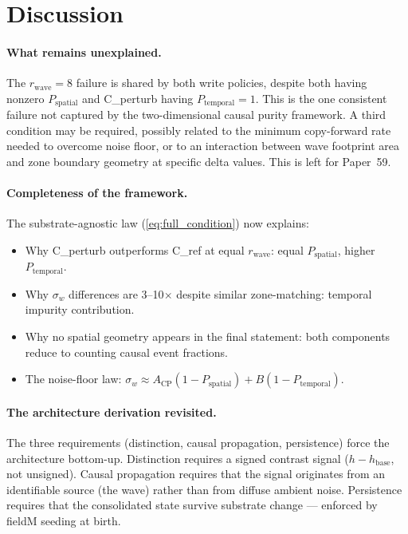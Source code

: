 \documentclass[11pt,a4paper]{article}
\newcommand{\Psp}{P_{\mathrm{spatial}}}
\newcommand{\Ptemp}{P_{\mathrm{temporal}}}
\begin{document}
\section{Discussion}

\paragraph{What remains unexplained.}
The $r_\mathrm{wave}=8$ failure is shared by both write policies, despite both having
nonzero $\Psp$ and C\_perturb having $\Ptemp=1$.
This is the one consistent failure not captured by the two-dimensional causal purity
framework.
A third condition may be required, possibly related to the minimum copy-forward rate
needed to overcome noise floor, or to an interaction between wave footprint area and
zone boundary geometry at specific delta values.
This is left for Paper~59.

\paragraph{Completeness of the framework.}
The substrate-agnostic law (\ref{eq:full_condition}) now explains:
\begin{itemize}
  \item Why C\_perturb outperforms C\_ref at equal $r_\mathrm{wave}$:
    equal $\Psp$, higher $\Ptemp$.
  \item Why $\sigma_w$ differences are 3--10$\times$ despite similar zone-matching:
    temporal impurity contribution.
  \item Why no spatial geometry appears in the final statement:
    both components reduce to counting causal event fractions.
  \item The noise-floor law: $\sigma_w \approx A_\mathrm{CP}(1-\Psp) + B(1-\Ptemp)$.
\end{itemize}

\paragraph{The architecture derivation revisited.}
The three requirements (distinction, causal propagation, persistence) force the
architecture bottom-up.
Distinction requires a signed contrast signal ($h - h_\mathrm{base}$, not unsigned).
Causal propagation requires that the signal originates from an identifiable source
(the wave) rather than from diffuse ambient noise.
Persistence requires that the consolidated state survive substrate change --- enforced
by fieldM seeding at birth.
\end{document}
